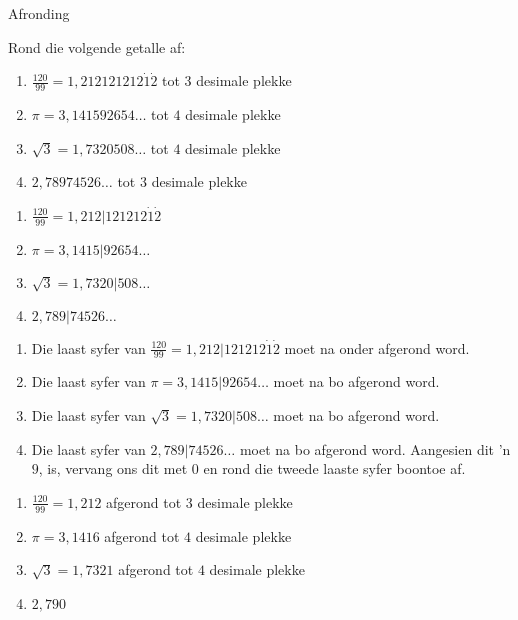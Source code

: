 \begin{wex}{Afronding }

{ Rond die volgende getalle af: 
\begin{enumerate}[itemsep=5pt, label=\textbf{\arabic*}. ] 

\item $\frac{120}{99}=1,212121212\dot{1}\dot{2}$ tot $3$ desimale plekke
\item $\pi =3,141592654\ldots$ tot $4$ desimale plekke
\item $\sqrt{3}=1,7320508\ldots$ tot $4$ desimale plekke
\item $2,78974526\ldots$ tot $3$ desimale plekke
\end{enumerate}
}
{


\begin{enumerate}[itemsep=5pt, label=\textbf{\arabic*}. ] 
\item $\frac{120}{99}=1,212|121212\dot{1}\dot{2}$
\item $\pi =3,1415|92654\ldots$
\item $\sqrt{3}=1,7320|508\ldots$
\item $2,789|74526\ldots$
\end{enumerate}

\begin{enumerate}[itemsep=5pt, label=\textbf{\arabic*}. ]
\item Die laast syfer van $\frac{120}{99}=1,212|121212\dot{1}\dot{2}$  moet na onder afgerond word.
\item Die laast syfer van $\pi =3,1415|92654\ldots$ moet na bo afgerond word.
\item Die laast syfer van $\sqrt{3}=1,7320|508\ldots$ moet na bo afgerond word.
\item Die laast syfer van $2,789|74526\ldots$ moet na bo afgerond word.  
\newline Aangesien dit ’n $9$, is, vervang ons dit met $0$ en
rond die tweede laaste syfer boontoe af.
\end{enumerate}

\begin{enumerate}[itemsep=5pt, label=\textbf{\arabic*}. ]
\item $\frac{120}{99}=1,212$ afgerond tot $3$ desimale plekke
\item $\pi =3,1416$  afgerond tot $4$ desimale plekke
\item $\sqrt{3}=1,7321$ afgerond tot $4$ desimale plekke
\item $2,790$
\end{enumerate}
}  
\end{wex}



